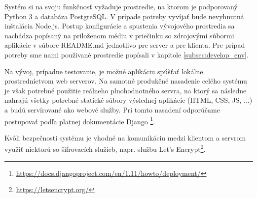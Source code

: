 Systém si na svoju funkčnosť vyžaduje prostredie, na ktorom je podporovaný Python 3
a databáza PostgreSQL. V prípade potreby vyvíjať bude nevyhnutná inštalácia Node.js.
Postup konfigurácie a spustenia vývojového prostredia sa nachádza popísaný na priloženom
médiu v priečinku so zdrojovými súbormi aplikácie v súbore README.md jednotlivo pre server
a pre klienta. Pre prípad potreby sme nami použivané prostredie popísali v kapitole
\ref{subsec:develop_env}.

Na vývoj, prípadne testovanie, je možné aplikáciu spúšťať lokálne prostredníctvom web serverov.
Na samotné produkčné nasadenie celého systému je však potrebné použitie reálneho plnohodnotného
servra, na ktorý sa následne nahrajú všetky potrebné statické súbory výslednej aplikácie
(HTML, CSS, JS, ...) a budú servírované ako webové služby. Pri tomto nasadení odporúčame
postupovať podľa platnej dokumentácie Django
\footnote{\url{https://docs.djangoproject.com/en/1.11/howto/deployment/}}.

Kvôli bezpečnosti systému je vhodné na komunikáciu medzi klientom a servrom využiť niektorú
so šifrovacích služieb, napr. službu Let's Encrypt\footnote{\url{https://letsencrypt.org/}}.

